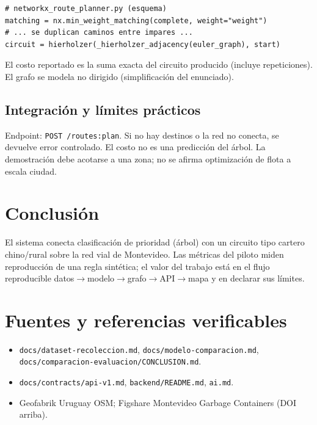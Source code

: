 \documentclass[11pt,a4paper]{article}
\begin{document}
\begin{lstlisting}
# networkx_route_planner.py (esquema)
matching = nx.min_weight_matching(complete, weight="weight")
# ... se duplican caminos entre impares ...
circuit = hierholzer(_hierholzer_adjacency(euler_graph), start)
\end{lstlisting}

El costo reportado es la suma exacta del circuito producido (incluye repeticiones). El grafo se modela no dirigido (simplificación del enunciado).

\subsection{Integración y límites prácticos}
Endpoint: \texttt{POST /routes:plan}. Si no hay destinos o la red no conecta, se devuelve error controlado. El costo no es una predicción del árbol. La demostración debe acotarse a una zona; no se afirma optimización de flota a escala ciudad.

\section*{Conclusión}
El sistema conecta clasificación de prioridad (árbol) con un circuito tipo cartero chino/rural sobre la red vial de Montevideo. Las métricas del piloto miden reproducción de una regla sintética; el valor del trabajo está en el flujo reproducible datos$\rightarrow$modelo$\rightarrow$grafo$\rightarrow$API$\rightarrow$mapa y en declarar sus límites.

\section*{Fuentes y referencias verificables}
\begin{itemize}[label=--]
\item \texttt{docs/dataset-recoleccion.md}, \texttt{docs/modelo-comparacion.md}, \texttt{docs/comparacion-evaluacion/CONCLUSION.md}.
\item \texttt{docs/contracts/api-v1.md}, \texttt{backend/README.md}, \texttt{ai.md}.
\item Geofabrik Uruguay OSM; Figshare Montevideo Garbage Containers (DOI arriba).
\end{itemize}
\end{document}
